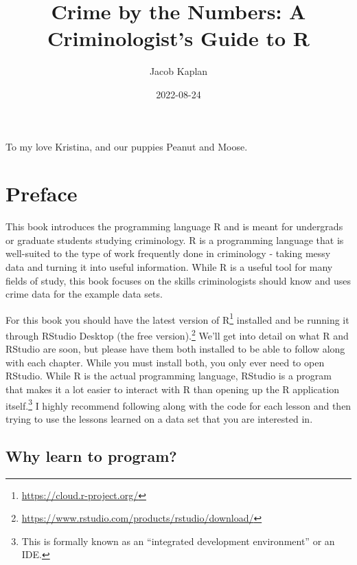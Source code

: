 \documentclass[
  a4paper,
]{krantz}
\title{Crime by the Numbers: A Criminologist's Guide to R}
\author{Jacob Kaplan}
\date{2022-08-24}
\renewcommand{\href}[2]{#2\footnote{\url{#1}}}
\begin{document}
\maketitle

\thispagestyle{empty}
\begin{center}
To my love Kristina, and our puppies Peanut and Moose.
\end{center}

\setlength{\abovedisplayskip}{-5pt}
\setlength{\abovedisplayshortskip}{-5pt}

{
\hypersetup{linkcolor=}
\setcounter{tocdepth}{2}
\tableofcontents
}

\frontmatter

\hypertarget{preface}{%
\chapter*{Preface}\label{preface}}

This book introduces the programming language R and is meant
for undergrads or graduate students studying criminology. R
is a programming language that is well-suited to the type of
work frequently done in criminology - taking messy data and
turning it into useful information. While R is a useful tool
for many fields of study, this book focuses on the skills
criminologists should know and uses crime data for the
example data sets.

For this book you should have the latest version of
\href{https://cloud.r-project.org/}{R} installed and be
running it through
\href{https://www.rstudio.com/products/rstudio/download/}{RStudio
Desktop (the free version).} We'll get into detail on what R
and RStudio are soon, but please have them both installed to
be able to follow along with each chapter. While you must
install both, you only ever need to open RStudio. While R is
the actual programming language, RStudio is a program that
makes it a lot easier to interact with R than opening up the
R application itself.\footnote{This is formally known as an
  ``integrated development environment'' or an IDE.} I
highly recommend following along with the code for each
lesson and then trying to use the lessons learned on a data
set that you are interested in.

\hypertarget{why-learn-to-program}{%
\section*{Why learn to
program?}\label{why-learn-to-program}}
\end{document}
